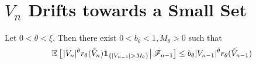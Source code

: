 \section[The Chain Drifts towards a Small Set]{$V_n$ Drifts towards a Small Set}
\label{sec:drift}
\begin{lemma}
  \label{lemma:1}
  Let $0 < \theta < \xi$. Then there exist
  $0 < b_{\theta} < 1, M_{\theta} > 0$
  such that
  \begin{equation}
    \label{eq:drift}
    \mathbb{E} \left[\left.
      |V_n|^\theta r_\theta(\tilde V_n)
      \mathbf{1}_{\{|V_{n-1}| > M_{\theta}\}} \right|
      \mathscr F_{n-1} \right]
    \leq
    b_{\theta} |V_{n-1}|^\theta
    r_{\theta}(\tilde V_{n-1})
  \end{equation}
\end{lemma}
